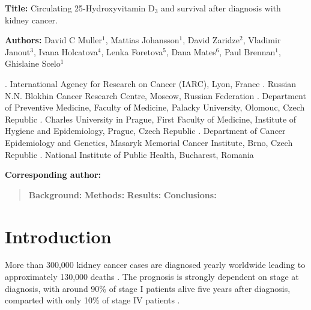 \documentclass[a4paper,11pt]{article}
\begin{document}
\doublespace
\noindent \textbf{Title:} Circulating 25-Hydroxyvitamin D$_3$ and 
survival after diagnosis with kidney cancer. 

\noindent \textbf{Authors:} David C Muller$^1$, Mattias Johansson$^1$, David 
Zaridze$^2$, Vladimir Janout$^3$, Ivana Holcatova$^4$, Lenka Foretova$^5$, Dana 
Mates$^6$, Paul Brennan$^1$, Ghislaine Scelo$^1$

{\footnotesize 
{}. International Agency for Research on Cancer (IARC), Lyon, France . Russian N.N. Blokhin Cancer Research Centre, Moscow, Russian Federation 
. Department of Preventive Medicine, Faculty of Medicine, Palacky University, 
Olomouc, Czech Republic . Charles University in Prague, First Faculty of Medicine, Institute of 
Hygiene 
and Epidemiology, Prague, Czech Republic . Department of Cancer Epidemiology and Genetics, Masaryk Memorial Cancer 
Institute, Brno, Czech Republic . National Institute of Public Health, Bucharest, Romania
}

\textbf{Corresponding author:} \newline




\begin{abstract}
\textbf{Background:} \newline
\textbf{Methods:} \newline
\textbf{Results:} \newline
\textbf{Conclusions:} \newline
\end{abstract}

\clearpage
\section*{Introduction}
More than 300,000 kidney cancer cases are diagnosed yearly worldwide leading to 
approximately 130,000 deaths \cite{ferlay_cancer_2013}. The prognosis is 
strongly dependent on stage at diagnosis, with around 90\% of stage I patients 
alive five years after diagnosis, comparted with only 10\% of stage IV patients 
\cite{CRUK_kidney_2014}.
\end{document}
